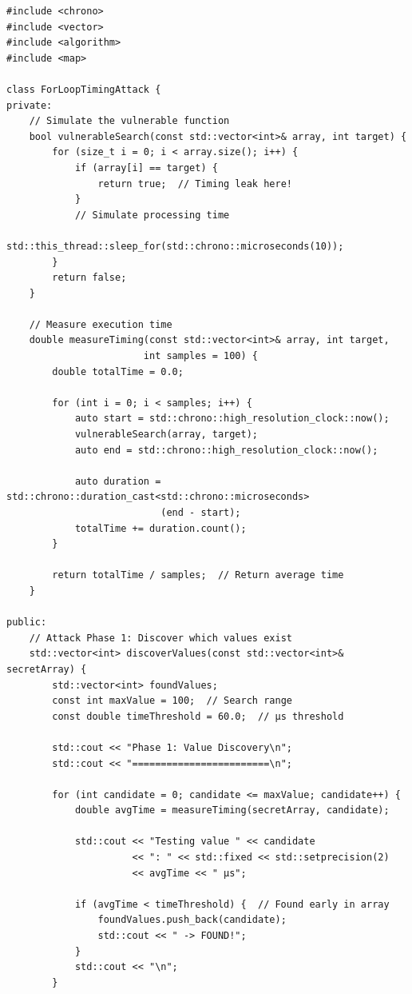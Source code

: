 \documentclass[12pt,a4paper]{article}
\theoremstyle{definition}
\begin{document}
\begin{lstlisting}[style=cryptoCode, caption={Complete Attack Implementation}]
#include <chrono>
#include <vector>
#include <algorithm>
#include <map>

class ForLoopTimingAttack {
private:
    // Simulate the vulnerable function
    bool vulnerableSearch(const std::vector<int>& array, int target) {
        for (size_t i = 0; i < array.size(); i++) {
            if (array[i] == target) {
                return true;  // Timing leak here!
            }
            // Simulate processing time
            std::this_thread::sleep_for(std::chrono::microseconds(10));
        }
        return false;
    }
    
    // Measure execution time
    double measureTiming(const std::vector<int>& array, int target, 
                        int samples = 100) {
        double totalTime = 0.0;
        
        for (int i = 0; i < samples; i++) {
            auto start = std::chrono::high_resolution_clock::now();
            vulnerableSearch(array, target);
            auto end = std::chrono::high_resolution_clock::now();
            
            auto duration = std::chrono::duration_cast<std::chrono::microseconds>
                           (end - start);
            totalTime += duration.count();
        }
        
        return totalTime / samples;  // Return average time
    }
    
public:
    // Attack Phase 1: Discover which values exist
    std::vector<int> discoverValues(const std::vector<int>& secretArray) {
        std::vector<int> foundValues;
        const int maxValue = 100;  // Search range
        const double timeThreshold = 60.0;  // μs threshold
        
        std::cout << "Phase 1: Value Discovery\n";
        std::cout << "========================\n";
        
        for (int candidate = 0; candidate <= maxValue; candidate++) {
            double avgTime = measureTiming(secretArray, candidate);
            
            std::cout << "Testing value " << candidate 
                      << ": " << std::fixed << std::setprecision(2) 
                      << avgTime << " μs";
            
            if (avgTime < timeThreshold) {  // Found early in array
                foundValues.push_back(candidate);
                std::cout << " -> FOUND!";
            }
            std::cout << "\n";
        }
        

\end{lstlisting}
\end{document}
